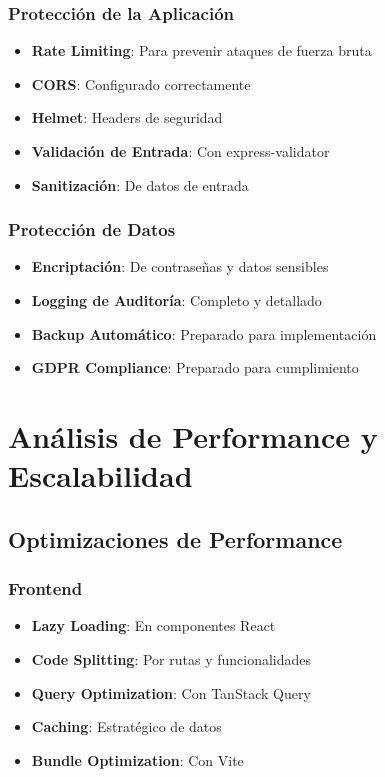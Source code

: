 \documentclass[12pt,a4paper]{article}
\begin{document}
\subsubsection{Protección de la Aplicación}
\begin{itemize}
    \item \textbf{Rate Limiting}: Para prevenir ataques de fuerza bruta
    \item \textbf{CORS}: Configurado correctamente
    \item \textbf{Helmet}: Headers de seguridad
    \item \textbf{Validación de Entrada}: Con express-validator
    \item \textbf{Sanitización}: De datos de entrada
\end{itemize}

\subsubsection{Protección de Datos}
\begin{itemize}
    \item \textbf{Encriptación}: De contraseñas y datos sensibles
    \item \textbf{Logging de Auditoría}: Completo y detallado
    \item \textbf{Backup Automático}: Preparado para implementación
    \item \textbf{GDPR Compliance}: Preparado para cumplimiento
\end{itemize}

\section{Análisis de Performance y Escalabilidad}

\subsection{Optimizaciones de Performance}

\subsubsection{Frontend}
\begin{itemize}
    \item \textbf{Lazy Loading}: En componentes React
    \item \textbf{Code Splitting}: Por rutas y funcionalidades
    \item \textbf{Query Optimization}: Con TanStack Query
    \item \textbf{Caching}: Estratégico de datos
    \item \textbf{Bundle Optimization}: Con Vite
\end{itemize}
\end{document}
